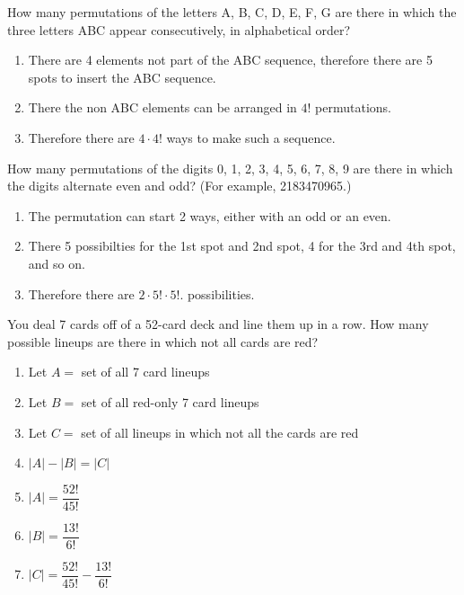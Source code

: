 \documentclass[openany, 11pt]{book}
\begin{document}
\begin{exercise}{}{}
	How many permutations of the letters A, B, C, D, E, F, G
	are there in which the three letters ABC appear consecutively, in
	alphabetical order?
	\begin{enumerate}[label={\textbullet}, leftmargin=*, itemsep=0pt, parsep=0pt]
		\item There are 4 elements not part of the ABC sequence, therefore there are 5
		      spots to insert the ABC sequence.
		\item There the non ABC elements can be arranged in $4!$ permutations.
		\item Therefore there are $4\cdot4!$ ways to make such a sequence.
	\end{enumerate}
\end{exercise}

\begin{exercise}{}{}
	How many permutations of the digits 0, 1, 2, 3, 4, 5, 6, 7, 8, 9 are there
	in which the digits alternate even and odd? (For example, 2183470965.)
	\begin{enumerate}[label={\textbullet}, leftmargin=*, itemsep=0pt, parsep=0pt]
		\item The permutation can start 2 ways, either with an odd or an even.
		\item There 5 possibilties for the 1st spot and 2nd spot, 4 for the 3rd and 4th
		      spot, and so on.
		\item Therefore there are $2\cdot 5!\cdot5!$. possibilities. \square
	\end{enumerate}
\end{exercise}

\begin{exercise}{}{}
	You deal 7 cards off of a 52-card deck and line them up in
	a row. How many possible lineups are there in which not all cards are red?
	\begin{enumerate}[label={\textbullet}, leftmargin=*, itemsep=0pt, parsep=0pt]
		\item Let $A=$ set of all 7 card lineups
		\item Let $B=$ set of all red-only 7 card lineups
		\item Let $C=$ set of all lineups in which not all the cards are red
		\item $|A| - |B| = |C|$
		\item $|A|=\dfrac{52!}{45!}$
		\item $|B|=\dfrac{13!}{6!}$
		\item $|C|=\dfrac{52!}{45!} - \dfrac{13!}{6!}$ \square
	\end{enumerate}
\end{exercise}
\end{document}
